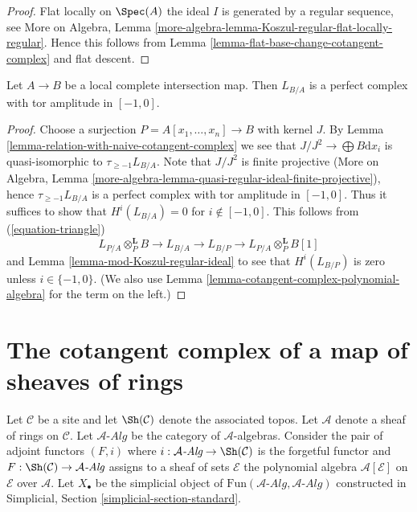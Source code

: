 \begin{proof}
Flat locally on $\Spec(A)$ the ideal $I$ is generated by a regular
sequence, see More on Algebra, Lemma
\ref{more-algebra-lemma-Koszul-regular-flat-locally-regular}.
Hence this follows from
Lemma \ref{lemma-flat-base-change-cotangent-complex}
and flat descent.
\end{proof}

\begin{proposition}
\label{proposition-cotangent-complex-local-complete-intersection}
Let $A \to B$ be a local complete intersection map.
Then $L_{B/A}$ is a perfect complex with tor amplitude in $[-1, 0]$.
\end{proposition}

\begin{proof}
Choose a surjection $P = A[x_1, \ldots, x_n] \to B$ with kernel $J$.
By Lemma \ref{lemma-relation-with-naive-cotangent-complex}
we see that $J/J^2 \to \bigoplus B\text{d}x_i$
is quasi-isomorphic to $\tau_{\geq -1}L_{B/A}$.
Note that $J/J^2$ is finite projective
(More on Algebra, Lemma
\ref{more-algebra-lemma-quasi-regular-ideal-finite-projective}),
hence $\tau_{\geq -1}L_{B/A}$ is a perfect complex with
tor amplitude in $[-1, 0]$.
Thus it suffices to show that $H^i(L_{B/A}) = 0$ for $i \not \in [-1, 0]$.
This follows from (\ref{equation-triangle})
$$
L_{P/A} \otimes_P^\mathbf{L} B \to L_{B/A} \to L_{B/P} \to
L_{P/A} \otimes_P^\mathbf{L} B[1]
$$
and Lemma \ref{lemma-mod-Koszul-regular-ideal}
to see that $H^i(L_{B/P})$ is zero unless $i \in \{-1, 0\}$.
(We also use Lemma \ref{lemma-cotangent-complex-polynomial-algebra}
for the term on the left.)
\end{proof}




\section{The cotangent complex of a map of sheaves of rings}
\label{section-cotangent-morphism-ringed-topoi}

\noindent
Let $\mathcal{C}$ be a site and let $\Sh(\mathcal{C})$ denote the
associated topos. Let $\mathcal{A}$ denote a sheaf of rings
on $\mathcal{C}$. Let $\mathcal{A}\textit{-Alg}$ be the category of
$\mathcal{A}$-algebras. Consider the pair of adjoint functors $(F, i)$ where
$i : \mathcal{A}\textit{-Alg} \to \Sh(\mathcal{C})$ is the forgetful functor and
$F : \Sh(\mathcal{C}) \to \mathcal{A}\textit{-Alg}$ assigns to a sheaf of sets
$\mathcal{E}$ the polynomial algebra $\mathcal{A}[\mathcal{E}]$ on
$\mathcal{E}$ over $\mathcal{A}$.
Let $X_\bullet$ be the simplicial object of
$\text{Fun}(\mathcal{A}\textit{-Alg}, \mathcal{A}\textit{-Alg})$
constructed in
Simplicial, Section \ref{simplicial-section-standard}.

